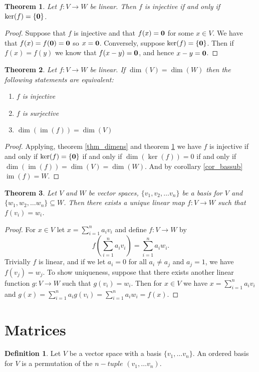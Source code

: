 \documentclass[oneside, 12pt]{book}
\DeclareMathOperator{\im}{im}
\newtheorem{thm}{Theorem}[section]
\theoremstyle{definition}
\newtheorem{defn}{Definition}[section]
\begin{document}
\begin{thm}
\label{thm_inj}
Let $f: V \to W$ be linear. Then $f$ is injective if and only if $\ker(f)=\{\bold{0}\}$.
\end{thm}
\begin{proof}
Suppose that $f$ is injective and that $f(x)=\bold{0}$ for some $x \in V$. We have that $f(x)=f(\bold{0})=\bold{0}$ so $x=\bold{0}$. Conversely, suppose $\ker(f)=\{\bold{0}\}$. Then if $f(x)=f(y)$ we know that $f(x-y)=\bold{0}$, and hence $x-y=\bold{0}$.
\end{proof}
\begin{thm}
\label{thm_injsur}
  Let $f: V \to W$ be linear. If $\dim(V)=\dim(W)$ then the following statements are equivalent:
  \begin{enumerate}
    \item $f$ is injective
    \item $f$ is surjective
    \item $\dim(\im(f))=\dim(V)$
  \end{enumerate}
\end{thm}
\begin{proof}
  Applying, theorem \ref{thm_dimens} and theorem \ref{thm_inj} we have $f$ is injective if and only if $\ker(f)=\{\bold{0}\}$ if and only if $\dim(\ker(f))=0$ if and only if $\dim(\im(f))=\dim(V)=\dim(W)$. And by corollary \ref{cor_bassub} $\im(f)=W$.
\end{proof}
\begin{thm}
\label{thm_uniqmap}
Let $V$ and $W$ be vector spaces,  $\{v_{1},v_{2}, \dots v_{n}\}$ be a basis for $V$ and $\{w_{1},w_{2}, \dots w_{n}\} \subseteq W$. Then there exists a unique linear map $f: V \to W$ such that $f(v_{i})=w_{i}$.
\end{thm}
\begin{proof}
For $x \in V$ let $x=\sum\limits_{i=1}^{n}a_{i}v_{i}$ and define $f:V \to W$ by \[f(\sum\limits_{i=1}^{n}a_{i}v_{i})=\sum\limits_{i=1}^{n}a_{i}w_{i}.\] Trivially $f$ is linear, and if we let $a_{i}=0$ for all $a_{i}\neq a_{j}$ and $a_{j}=1$, we have $f(v_{j})=w_{j}$. To show uniqueness, suppose that there exists another linear function $g:V \to W$ such that $g(v_{i})=w_{i}$. Then for $x \in V$ we have $x=\sum\limits_{i=1}^{n}a_{i}v_{i}$ and $g(x)=\sum\limits_{i=1}^{n}a_{i}g(v_{i})=\sum\limits_{i=1}^{n}a_{i}w_{i}=f(x)$.
\end{proof}
\section{Matrices}
\begin{defn}
\label{defn_orbase}
Let $V$ be a vector space with a basis $\{v_{1},\dots v_{n}\}$. An ordered basis for $V$ is a permutation of the $n-tuple$ $(v_{1}, \dots v_{n})$.
\end{defn}
\end{document}
